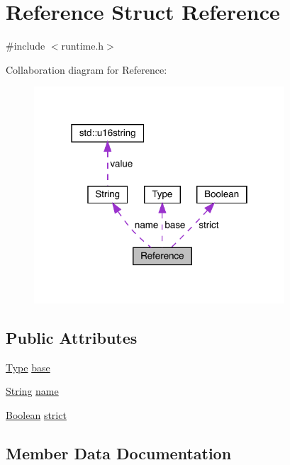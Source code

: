 \hypertarget{struct_reference}{}\section{Reference Struct Reference}
\label{struct_reference}


{\ttfamily \#include $<$runtime.\+h$>$}



Collaboration diagram for Reference\+:
\nopagebreak
\begin{figure}[H]
\begin{center}
\leavevmode
\includegraphics[width=265pt]{struct_reference__coll__graph}
\end{center}
\end{figure}
\subsection*{Public Attributes}
\begin{DoxyCompactItemize}
\item 
\hyperlink{class_type}{Type} \hyperlink{struct_reference_a5716b232474e0d1edac8d00af9c84751}{base}
\item 
\hyperlink{struct_string}{String} \hyperlink{struct_reference_a57fd6856086b16e1740a6f867dedd3f7}{name}
\item 
\hyperlink{struct_boolean}{Boolean} \hyperlink{struct_reference_a50a8f0c6fe1ae030e97ad258e60c6d2b}{strict}
\end{DoxyCompactItemize}


\subsection{Member Data Documentation}
\mbox{\label{struct_reference_a5716b232474e0d1edac8d00af9c84751}} 
